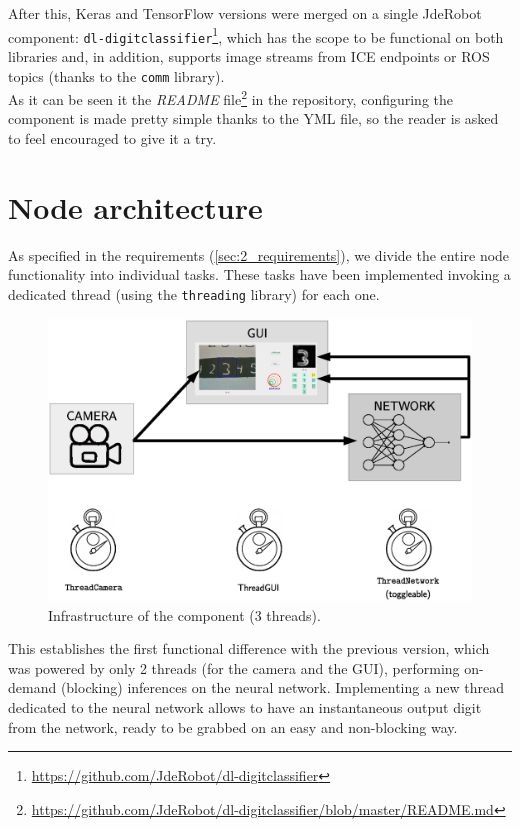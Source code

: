 		After this, Keras and TensorFlow versions were merged on a single JdeRobot component: \texttt{dl-digitclassifier}\footnote{\url{https://github.com/JdeRobot/dl-digitclassifier}}, which has the scope to be functional on both libraries and, in addition, supports image streams from ICE endpoints or ROS topics (thanks to the \texttt{comm} library).\\
		
		As it can be seen it the \emph{README} file\footnote{\url{https://github.com/JdeRobot/dl-digitclassifier/blob/master/README.md}} in the repository, configuring the component is made pretty simple thanks to the YML file, so the reader is asked to feel encouraged to give it a try.\\
		
	\section{Node architecture}
		As specified in the requirements (\autoref{sec:2_requirements}), we divide the entire node functionality into individual tasks. These tasks have been implemented invoking a dedicated thread (using the \texttt{threading} library) for each one.\\
		
		\begin{figure}[h]
			\centering
			\includegraphics[width=5in]{images/digitclassifier_infrastructure}
			\caption{Infrastructure of the component (3 threads).}
			\label{fig:4_digitclassifier_infrastructure}
		\end{figure}
		
		
		
		This establishes the first functional difference with the previous version, which was powered by only 2 threads (for the camera and the GUI), performing on-demand (blocking) inferences on the neural network. Implementing a new thread dedicated to the neural network allows to have an instantaneous output digit from the network, ready to be grabbed on an easy and non-blocking way.\\
		
